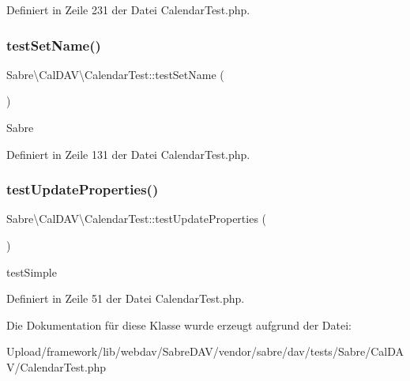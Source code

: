 Definiert in Zeile 231 der Datei Calendar\+Test.\+php.

\mbox{\label{class_sabre_1_1_cal_d_a_v_1_1_calendar_test_a6c92f4ad5c3e50c73c72883eca157fd7}} 
\subsubsection{\texorpdfstring{test\+Set\+Name()}{testSetName()}}
{\footnotesize\ttfamily Sabre\textbackslash{}\+Cal\+D\+A\+V\textbackslash{}\+Calendar\+Test\+::test\+Set\+Name (\begin{DoxyParamCaption}{ }\end{DoxyParamCaption})}

Sabre 

Definiert in Zeile 131 der Datei Calendar\+Test.\+php.

\mbox{\label{class_sabre_1_1_cal_d_a_v_1_1_calendar_test_a2704a311de4416b070ac628564d47245}} 
\subsubsection{\texorpdfstring{test\+Update\+Properties()}{testUpdateProperties()}}
{\footnotesize\ttfamily Sabre\textbackslash{}\+Cal\+D\+A\+V\textbackslash{}\+Calendar\+Test\+::test\+Update\+Properties (\begin{DoxyParamCaption}{ }\end{DoxyParamCaption})}

test\+Simple 

Definiert in Zeile 51 der Datei Calendar\+Test.\+php.



Die Dokumentation für diese Klasse wurde erzeugt aufgrund der Datei\+:\begin{DoxyCompactItemize}
\item 
Upload/framework/lib/webdav/\+Sabre\+D\+A\+V/vendor/sabre/dav/tests/\+Sabre/\+Cal\+D\+A\+V/Calendar\+Test.\+php\end{DoxyCompactItemize}
